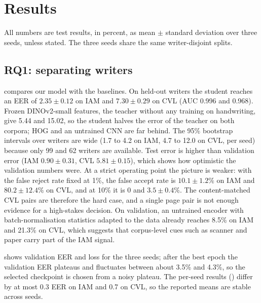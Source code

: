 \section{Results}
\label{sec:results}
All numbers are test results, in percent, as mean $\pm$ standard deviation over three seeds, unless stated.
The three seeds share the same writer-disjoint splits.

\subsection{RQ1: separating writers}
 compares our model with the baselines.
On held-out writers the student reaches an EER of $2.35\pm0.12$ on IAM and $7.30\pm0.29$ on CVL (AUC 0.996 and 0.968).
Frozen DINOv2-small features, the teacher without any training on handwriting, give 5.44 and 15.02, so the student halves the error of the teacher on both corpora; HOG and an untrained CNN are far behind.
The 95\% bootstrap intervals over writers are wide (1.7 to 4.2 on IAM, 4.7 to 12.0 on CVL, per seed) because only 99 and 62 writers are available.
Test error is higher than validation error (IAM $0.90\pm0.31$, CVL $5.81\pm0.15$), which shows how optimistic the validation numbers were.
At a strict operating point the picture is weaker: with the false reject rate fixed at 1\%, the false accept rate is $10.1\pm1.2\%$ on IAM and $80.2\pm12.4\%$ on CVL, and at 10\% it is 0 and $3.5\pm0.4\%$.
The content-matched CVL pairs are therefore the hard case, and a single page pair is not enough evidence for a high-stakes decision.
On validation, an untrained encoder with batch-normalisation statistics adapted to the data already reaches 8.5\% on IAM and 21.3\% on CVL, which suggests that corpus-level cues such as scanner and paper carry part of the IAM signal.

\begin{table}[t]
\caption{Single-reference test results over all page pairs. The untrained CNN is averaged over three seeds; HOG and frozen DINOv2 have no training and are deterministic.}
\label{tab:main}
\centering\scriptsize
\setlength{\tabcolsep}{3pt}
\resizebox{\columnwidth}{!}{}
\end{table}

 shows validation EER and loss for the three seeds; after the best epoch the validation EER plateaus and fluctuates between about 3.5\% and 4.3\%, so the selected checkpoint is chosen from a noisy plateau.
The per-seed results () differ by at most 0.3 EER on IAM and 0.7 on CVL, so the reported means are stable across seeds.

